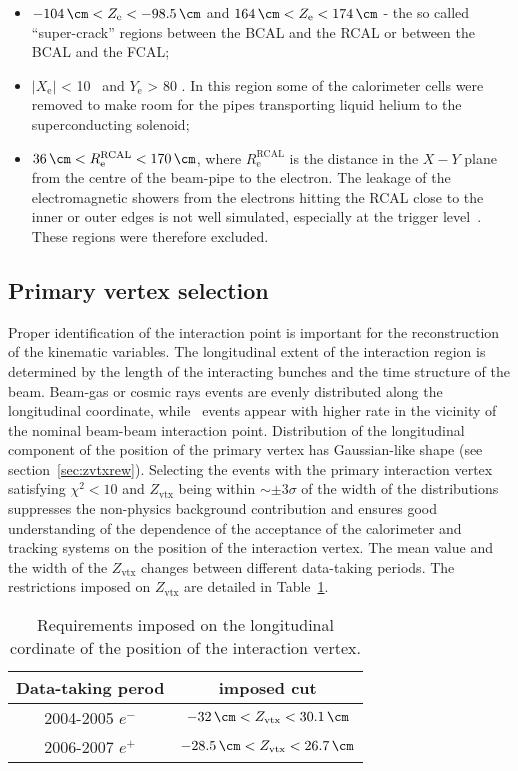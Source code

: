 \begin{itemize}
	\begin{itemize}
		\item $ -104\, \cm < Z_\text{e} < -98.5\, \cm	$ and $ 164\, \cm < Z_\text{e} < 174\, \cm $ - the so called ``super-crack'' regions between the BCAL and the RCAL or between the BCAL and the FCAL;
		\item $\left| X_\text{e} \right|$ < 10 \cm\, and $Y_\text{e}$ > 80 \cm. In this region some of the calorimeter cells were removed to make room for the  pipes transporting  liquid helium to the superconducting solenoid;
		\item $ 36\, \cm < R^\text{RCAL}_\text{e} < 170\, \cm $, where $R^\text{RCAL}_\text{e}$ is the distance in the $X-Y$ plane from the centre of the beam-pipe to the electron. The leakage of the electromagnetic showers from the electrons hitting the RCAL close to the inner or outer edges is not well simulated, especially at the trigger level~\cite{januschek-p96}. These regions were therefore excluded. 
	\end{itemize}
\end{itemize}

\subsection{Primary vertex selection}
\label{subsec:vtxselect}
Proper identification of the interaction point is important for the reconstruction of the kinematic variables. The longitudinal extent of the interaction region is determined by the length of the interacting bunches and the time structure of the beam. Beam-gas or cosmic rays events are evenly distributed along the longitudinal coordinate, while \ep\, events appear with higher rate in the vicinity of the nominal beam-beam interaction point. Distribution of the longitudinal component of the position of the primary vertex has Gaussian-like shape (see section~\ref{sec:zvtxrew}). Selecting the events with the primary interaction vertex satisfying $\chi^2 < 10$ and $Z_\text{vtx}$ being within $\sim \pm 3\sigma$ of the width of the distributions suppresses the non-physics background contribution and ensures good understanding of the dependence of the acceptance of the calorimeter and tracking systems on the position of the interaction vertex. The mean value and the width of the $Z_\text{vtx}$ changes between different data-taking periods. The restrictions imposed on $Z_\text{vtx}$ are detailed in Table~\ref{tab:zvxcut}.
\begin{table}[htbp]
	\centering
		\begin{tabular}{|c|c|}
			\hline
			Data-taking perod & imposed cut \\
			\hline
			\hline
			2004-2005 $e^{-}$ & $-32\,\cm<Z_\text{vtx}<30.1\,\cm$ \\
			2006-2007 $e^{+}$ & $-28.5\,\cm<Z_\text{vtx}<26.7\,\cm$ \\
			\hline
		\end{tabular}
	\caption{Requirements imposed on the longitudinal cordinate of the position of the interaction vertex.}
	\label{tab:zvxcut}
\end{table}

